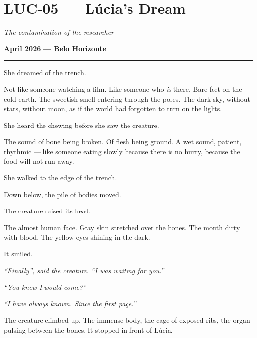 \section*{\textbf{LUC-05} --- Lúcia's Dream}

\noindent \textit{The contamination of the researcher}

\noindent \textbf{April 2026 --- Belo Horizonte}

\vspace{0.5em}\noindent\rule{\textwidth}{0.5pt}\vspace{0.5em}

\noindent She dreamed of the trench.

\noindent Not like someone watching a film. Like someone who \textit{is} there. Bare feet on the cold earth. The sweetish smell entering through the pores. The dark sky, without stars, without moon, as if the world had forgotten to turn on the lights.

\noindent She heard the chewing before she saw the creature.

\noindent The sound of bone being broken. Of flesh being ground. A wet sound, patient, rhythmic --- like someone eating slowly because there is no hurry, because the food will not run away.

\noindent She walked to the edge of the trench.

\noindent Down below, the pile of bodies moved.

\noindent The creature raised its head.

\noindent The almost human face. Gray skin stretched over the bones. The mouth dirty with blood. The yellow eyes shining in the dark.

\noindent It smiled.

\noindent \textit{\textquotedblleft{}Finally\textquotedblright{}\textit{, said the creature. }\textquotedblleft{}I was waiting for you.\textquotedblright{}}

\noindent \textit{\textquotedblleft{}You knew I would come?\textquotedblright{}}

\noindent \textit{\textquotedblleft{}I have always known. Since the first page.\textquotedblright{}}

\noindent The creature climbed up. The immense body, the cage of exposed ribs, the organ pulsing between the bones. It stopped in front of Lúcia.

